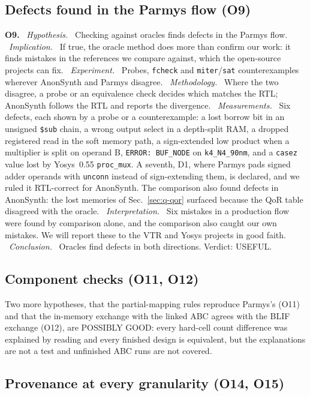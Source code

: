 \documentclass[conference]{IEEEtran}
\newcommand{\code}[1]{\texttt{#1}}
\newcommand{\argid}[1]{\par\smallskip\noindent\textbf{#1.}}
\newcommand{\ah}[1]{\ \textit{#1.}\ }
\begin{document}
\subsection{Defects found in the Parmys flow (O9)}
\label{sec:parmys-bugs}

\argid{O9}
\ah{Hypothesis} Checking against oracles finds defects in the Parmys flow.
\ah{Implication} If true, the oracle method does more than confirm our work: it finds mistakes in the references we compare against, which the open-source projects can fix.
\ah{Experiment} Probes, \code{fcheck} and \code{miter}/\code{sat} counterexamples wherever AnonSynth and Parmys disagree.
\ah{Methodology} Where the two disagree, a probe or an equivalence check decides which matches the RTL; AnonSynth follows the RTL and reports the divergence.
\ah{Measurements} Six defects, each shown by a probe or a counterexample: a lost borrow bit in an unsigned \code{\$sub} chain, a wrong output select in a depth-split RAM, a dropped registered read in the soft memory path, a sign-extended low product when a multiplier is split on operand B, \code{ERROR: BUF\_NODE} on \code{k4\_N4\_90nm}, and a \code{casez} value lost by Yosys~0.55 \code{proc\_mux}. A seventh, D1, where Parmys pads signed adder operands with \code{unconn} instead of sign-extending them, is declared, and we ruled it RTL-correct for AnonSynth. The comparison also found defects in AnonSynth: the lost memories of Sec.~\ref{sec:q-qor} surfaced because the QoR table disagreed with the oracle.
\ah{Interpretation} Six mistakes in a production flow were found by comparison alone, and the comparison also caught our own mistakes. We will report these to the VTR and Yosys projects in good faith.
\ah{Conclusion} Oracles find defects in both directions. Verdict: USEFUL.

\subsection{Component checks (O11, O12)}

Two more hypotheses, that the partial-mapping rules reproduce Parmys's (O11) and that the in-memory exchange with the linked ABC agrees with the BLIF exchange (O12), are POSSIBLY GOOD: every hard-cell count difference was explained by reading and every finished design is equivalent, but the explanations are not a test and unfinished ABC runs are not covered.

\subsection{Provenance at every granularity (O14, O15)}
\label{sec:q-prov}
\end{document}
